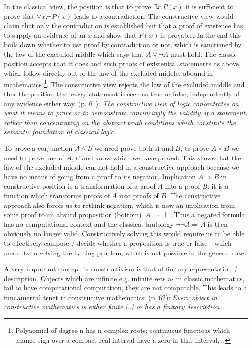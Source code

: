 In the classical view, the position is that to prove $\exists x. P(x)$ it is sufficient to prove that $\forall x. \neg P(x)$ leads to a contradiction. The constructive view would claim that only the contradiction is established but that a proof of existence has to supply an evidence of an $x$ and show that $P(x)$ is provable. In the end this boils down whether to use proof by contradiction or not, which is sanctioned by the law of the excluded middle which says that $A \lor \neg A$ must hold. The classic position accepts that it does and such proofs of existential statements as above, which follow directly out of the law of the excluded middle, abound in mathematics \footnote{Polynomial of degree n has n complex roots; continuous functions which change sign over a compact real interval have a zero in that interval,...}. The constructive view rejects the law of the excluded middle and thus the position that every statement is seen as true or false, independently of any evidence either way. \cite{thompson_type_1991} (p. 61): \textit{The constructive view of logic concentrates on what it means to prove or to demonstrate convincingly the validity of a statement, rather than concentrating on the abstract truth conditions which constitute the semantic foundation of classical logic}.

To prove a conjunction $A \land B$ we need prove both $A$ and $B$, to prove $A \lor B$ we need to prove one of $A, B$ and know which we have proved. This shows that the law of the excluded middle can not hold in a constructive approach because we have no means of going from a proof to its negation. Implication $A \Rightarrow B$ in constructive position is a transformation of a proof $A$ into a proof $B$: it is a function which transforms proofs of $A$ into proofs of $B$. The constructive approach also forces us to rethink negation, which is now an implication from some proof to an absurd proposition (bottom): $A \Rightarrow \perp$. Thus a negated formula has no computational context and the classical tautology $\neg \neg A \Rightarrow A$ is then obviously no longer valid.  Constructively solving this would require us to be able to effectively compute / decide whether a proposition is true or false - which amounts to solving the halting problem, which is not possible in the general case.

A very important concept in constructivism is that of finitary representation / description. Objects which are infinite e.g. infinite sets as in classic mathematics, fail to have computational computation, they are not computable. This leads to a fundamental tenet in constructive mathematics: \cite{thompson_type_1991} (p. 62): \textit{Every object in constructive mathematics is either finite [..] or has a finitary description}

